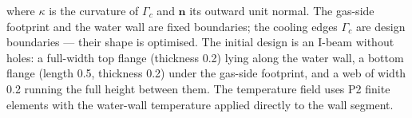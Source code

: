 \documentclass[preview]{standalone}
\begin{document}
where $\kappa$ is the curvature of $\Gamma_c$ and $\mathbf n$ its outward unit normal.  The gas-side footprint and the water wall are fixed boundaries; the cooling edges $\Gamma_c$ are design boundaries — their shape is optimised.
The initial design is an I-beam without holes: a full-width top flange (thickness 0.2) lying along the water wall, a bottom flange (length 0.5, thickness 0.2) under the gas-side footprint, and a web of width 0.2 running the full height between them.  The temperature field uses P2 finite elements with the water-wall temperature applied directly to the wall segment.
\end{document}
